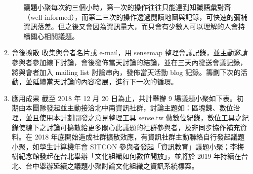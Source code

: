 \documentclass[12pt,a4paper]{article}
\begin{document}
\begin{enumerate}
\begin{enumerate}
議題小聚每次約三個小時，第一次的操作往往只能達到知識語彙對齊（well-informed），而第二三次的操作透過閱讀地圖與記錄，可快速的彌補資訊落差。但之後又會因為資訊量大，而只會有少數人可以理解的人會持續關心相關議題。
\end{enumerate}
\item 會後擴散
\label{sec:org034829b}
收集與會者名片或 e-mail，用 sensemap 整理會議記錄，並主動邀請參與者參加線下討論，會後發佈當天討論的結論，並在三天內發送會議記錄，將與會者加入 mailing list 討論串內，發佈當天活動 blog 記錄。籌劃下次的活動，並延續當天討論的內容發展，進行下一次的循環。
\item 應用成果
\label{sec:orgdf32385}
截至 2018 年 12 月 20 日為止，共計舉辦 9 場議題小聚如下表。初期由本團隊發起並主動接洽北中南資訊社群，討論主題如：區塊鍊、數位治理，並且使用本計劃開發之意見整理工具 sense.tw 做數位紀錄，數位工具之紀錄使線下之討論可擴散給更多關心此議題的社群參與者，及非同步協作補充資料。在 2018 年底開始造成社群擴散效應，有資訊社群主動聯絡自行發起議題小聚，如學生計算機年會 SITCON 參與者發起「資訊教育」議題小聚；李梅樹紀念館發起在台北舉辦「文化組織如何數位開放」，並將於 2019 年持續在台北、台中舉辦延續之議題小聚討論文化組織之資訊系統標案。


\end{enumerate}
\end{document}
